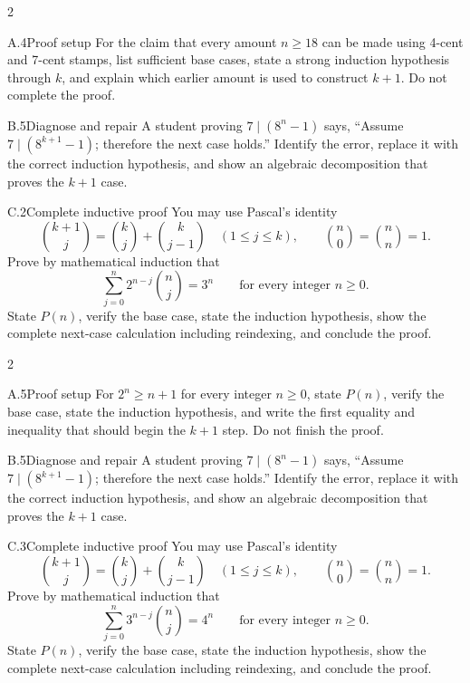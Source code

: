 \documentclass[9pt]{extarticle}
\begin{document}
\CoreWorkArea
\FormBreak
{}
\begin{multicols}{2}
\begin{CompactCoreProblem}{A.4}{Proof setup}
For the claim that every amount $n\ge18$ can be made using 4-cent and 7-cent stamps, list sufficient base cases, state a strong induction hypothesis through $k$, and explain which earlier amount is used to construct $k+1$. Do not complete the proof.
\end{CompactCoreProblem}
\begin{CompactCoreProblem}{B.5}{Diagnose and repair}
A student proving $7\mid(8^n-1)$ says, “Assume $7\mid(8^{k+1}-1)$; therefore the next case holds.” Identify the error, replace it with the correct induction hypothesis, and show an algebraic decomposition that proves the $k+1$ case.
\end{CompactCoreProblem}
\end{multicols}
\begin{CompactCoreProblem}{C.2}{Complete inductive proof}
You may use Pascal's identity
\[
\binom{k+1}{j}=\binom{k}{j}+\binom{k}{j-1}
\quad(1\le j\le k),\qquad
\binom{n}{0}=\binom{n}{n}=1.
\]
Prove by mathematical induction that
\[
\sum_{j=0}^{n} 2^{n-j}\binom{n}{j}=3^n\qquad\text{for every integer }n\ge0.
\]
State $P(n)$, verify the base case, state the induction hypothesis, show the complete next-case calculation including reindexing, and conclude the proof.
\end{CompactCoreProblem}
\CoreWorkArea
\FormBreak
{}
\begin{multicols}{2}
\begin{CompactCoreProblem}{A.5}{Proof setup}
For $2^n\ge n+1$ for every integer $n\ge0$, state $P(n)$, verify the base case, state the induction hypothesis, and write the first equality and inequality that should begin the $k+1$ step. Do not finish the proof.
\end{CompactCoreProblem}
\begin{CompactCoreProblem}{B.5}{Diagnose and repair}
A student proving $7\mid(8^n-1)$ says, “Assume $7\mid(8^{k+1}-1)$; therefore the next case holds.” Identify the error, replace it with the correct induction hypothesis, and show an algebraic decomposition that proves the $k+1$ case.
\end{CompactCoreProblem}
\end{multicols}
\begin{CompactCoreProblem}{C.3}{Complete inductive proof}
You may use Pascal's identity
\[
\binom{k+1}{j}=\binom{k}{j}+\binom{k}{j-1}
\quad(1\le j\le k),\qquad
\binom{n}{0}=\binom{n}{n}=1.
\]
Prove by mathematical induction that
\[
\sum_{j=0}^{n} 3^{n-j}\binom{n}{j}=4^n\qquad\text{for every integer }n\ge0.
\]
State $P(n)$, verify the base case, state the induction hypothesis, show the complete next-case calculation including reindexing, and conclude the proof.
\end{CompactCoreProblem}
\end{document}
